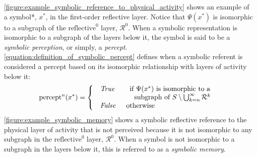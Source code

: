 {\mbox{\autoref{figure:example_symbolic_reference_to_physical_activity}}}
shows an example of a symbol*, $x^*$, in the first-order reflective
layer.  Notice that $\Psi(x^*)$ is isomorphic to a subgraph of the
$\text{reflective}^0$ layer, $\mathcal{R}^0$.  When a symbolic
representation is isomorphic to a subgraph of the layers below it, the
symbol is said to be a {\emph{symbolic perception}}, or simply, a
{\emph{percept}}.
{\mbox{\autoref{equation:definition_of_symbolic_percept}}} defines
when a symbolic referent is considered a percept based on its
isomorphic relationship with layers of activity below it:
\begin{equation}
\label{equation:definition_of_symbolic_percept}
\text{percept}^n(x^*) = \left\{\begin{array}{ll}
                                 \begin{array}{l}
                                   \text{\emph{True}} \\
                                   \text{~~}
                                 \end{array} & \begin{array}{l}
                                                 \text{if } \Psi(x^*) \text{ is isomorphic to a} \\
                                                 \text{~~subgraph of } S \setminus \bigcup_{k=n}^\infty{\mathcal{R}^k}
                                               \end{array} \\
                                 \begin{array}{l}
                                   \text{\emph{False}}
                                 \end{array} & \text{otherwise}
                               \end{array}\right.
\end{equation}
{\mbox{\autoref{figure:example_symbolic_memory}}} shows a symbolic
reflective reference to the physical layer of activity that is not
perceived because it is not isomorphic to any subgraph in the
$\text{reflective}^0$ layer, $\mathcal{R}^0$.  When a symbol is not
isomorphic to a subgraph in the layers below it, this is referred to
as a \emph{symbolic memory}.
